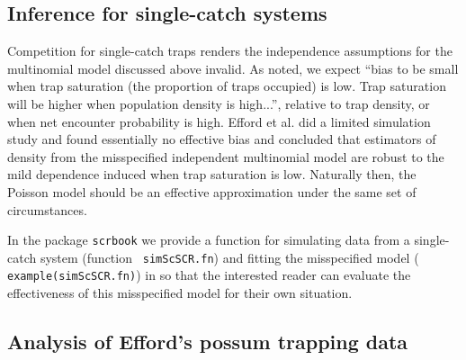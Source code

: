 \subsection{Inference for single-catch systems}

Competition for single-catch traps renders the independence
assumptions for the multinomial model discussed above invalid.  As
\citet{efford_etal:2009euring} noted, we expect ``bias to be small
when trap saturation (the proportion of traps occupied) is low.  Trap
saturation will be higher when population density is high...'',
relative to trap density, or when net encounter probability is high.
Efford et al. did a limited simulation study and found essentially no
effective bias and concluded that estimators of density from the
misspecified independent multinomial model are robust to the mild
dependence induced when trap saturation is low.  Naturally then, the
Poisson model should be an effective approximation under the same set
of circumstances.

In the \R package \mbox{\tt scrbook} we provide a function for
simulating data from a single-catch system (function \mbox{\tt
  simScSCR.fn}) and fitting the misspecified model (\mbox{\tt
  example(simScSCR.fn)}) in \jags so that the interested reader can
evaluate the effectiveness of this misspecified model for their own
situation.


\subsection{Analysis of Efford's possum trapping data}

